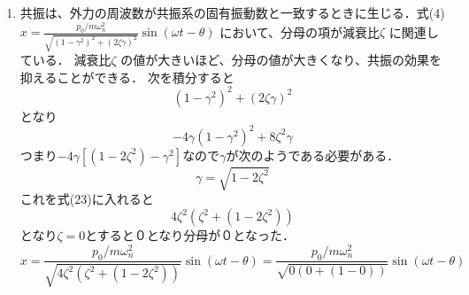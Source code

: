 \documentclass[a4paper,10.5pt]{jsarticle}
\begin{document}
\begin{enumerate}
  \item 共振は、外力の周波数が共振系の固有振動数と一致するときに生じる．式(4)
    $x = \frac{{p_0/m\omega_n^2}}{{\sqrt{{(1-\gamma^2)^2+(2\zeta\gamma)^2}}}}\sin(\omega{t}-\theta)$
  において、分母の項が減衰比$\zeta$ に関連している．
  減衰比$\zeta$ の値が大きいほど、分母の値が大きくなり、共振の効果を抑えることができる．
  次を積分すると
  \begin{equation}
   {{(1-\gamma^2)^2+(2\zeta\gamma)^2}} 
  \end{equation}
  となり
  \begin{equation}
    -4\gamma(1-\gamma^2)^2+8\zeta^2\gamma
  \end{equation} 
  つまり$-4\gamma[(1-2\zeta^2)-\gamma^2]$なので$\gamma$が次のようである必要がある．
  \begin{equation}
   \gamma={\sqrt{1-2\zeta^2}}
  \end{equation}  
  これを式(23)に入れると
  \begin{equation}
    4\zeta^2(\zeta^2+(1-2\zeta^2))
  \end{equation}    
  となり$\zeta=0$とすると０となり分母が０となった．
  \begin{equation}
  x = \frac{{p_0/m\omega_n^2}}{{\sqrt{{4\zeta^2(\zeta^2+(1-2\zeta^2))}}}}\sin(\omega{t}-\theta)
    = \frac{{p_0/m\omega_n^2}}{{\sqrt{{0(0+(1-0))}}}}\sin(\omega{t}-\theta)
\end{equation} 
\\


\end{enumerate}
\end{document}
